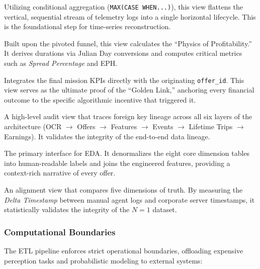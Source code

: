 \begin{description}[style=multiline, leftmargin=3.5cm, font=\ttfamily\small]
    \item[v\_trip\_funnel\_wide] Utilizing conditional aggregation (\texttt{MAX(CASE WHEN...)}), this view flattens the vertical, sequential stream of telemetry logs into a single horizontal lifecycle. This is the foundational step for time-series reconstruction.

    \item[v\_trip\_final\_kpis] Built upon the pivoted funnel, this view calculates the ``Physics of Profitability.'' It derives durations via Julian Day conversions and computes critical metrics such as \textit{Spread Percentage} and EPH.

    \item[v\_mission\_dossier] Integrates the final mission KPIs directly with the originating \texttt{offer\_id}. This view serves as the ultimate proof of the ``Golden Link,'' anchoring every financial outcome to the specific algorithmic incentive that triggered it.

    \item[v\_broche\_fks] A high-level audit view that traces foreign key lineage across all six layers of the architecture (OCR $\to$ Offers $\to$ Features $\to$ Events $\to$ Lifetime Trips $\to$ Earnings). It validates the integrity of the end-to-end data lineage.

    \item[v\_offers\_human] The primary interface for EDA. It denormalizes the eight core dimension tables into human-readable labels and joins the engineered features, providing a context-rich narrative of every offer.

    \item[v\_lifecycle\_audit] An alignment view that compares five dimensions of truth. By measuring the \textit{Delta Timestamp} between manual agent logs and corporate server timestamps, it statistically validates the integrity of the $N=1$ dataset.

\end{description}


\subsubsection{Computational Boundaries}
The ETL pipeline enforces strict operational boundaries, offloading expensive perception tasks and probabilistic modeling to external systems:

